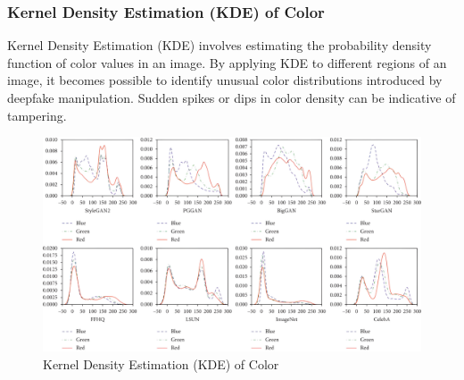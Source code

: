 \subsubsection{Kernel Density Estimation (KDE) of Color}

Kernel Density Estimation (KDE) involves estimating the probability density function of color values in an image. By applying KDE to different regions of an image, it becomes possible to identify unusual color distributions introduced by deepfake manipulation. Sudden spikes or dips in color density can be indicative of tampering.

\begin{figure}[htbp]
    \centering
    \includegraphics[width=5in]{img/KDE.png}
    \caption{{Kernel Density Estimation (KDE) of Color}}
\end{figure}
